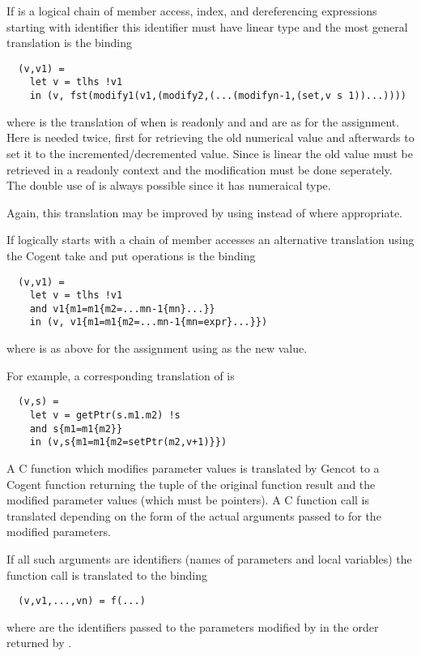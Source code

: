 If  is a logical chain of  member access, index, and dereferencing expressions starting with identifier 
this identifier must have linear type and the most general translation is the binding
\begin{verbatim}
  (v,v1) = 
    let v = tlhs !v1
    in (v, fst(modify1(v1,(modify2,(...(modifyn-1,(set,v s 1))...))))
\end{verbatim}
where  is the translation of  when  is readonly and  and  are as 
for the assignment. Here  is needed twice, first for retrieving the old
numerical value  and afterwards to set it to the incremented/decremented value. Since  is linear the old
value must be retrieved in a readonly context and the modification must be done seperately. The double use of 
is always possible since it has numeraical type.

Again, this translation may be improved by using  instead of  where appropriate.

If  logically starts with a chain of member accesses  an alternative translation using the Cogent
take and put operations is the binding
\begin{verbatim}
  (v,v1) =
    let v = tlhs !v1
    and v1{m1=m1{m2=...mn-1{mn}...}} 
    in (v, v1{m1=m1{m2=...mn-1{mn=expr}...}})
\end{verbatim}
where  is as above for the assignment using  as the new value.

For example, a corresponding translation of  is
\begin{verbatim}
  (v,s) =
    let v = getPtr(s.m1.m2) !s
    and s{m1=m1{m2}}
    in (v,s{m1=m1{m2=setPtr(m2,v+1)}})
\end{verbatim}

A C function which modifies parameter values is translated by Gencot to a Cogent function returning the tuple 
of the original function result  and the modified parameter values  (which must be pointers). 
A C function call  is
translated depending on the form of the actual arguments passed to  for the modified parameters.

If all such arguments are identifiers (names of parameters and local variables) the function call is translated to
the binding
\begin{verbatim}
  (v,v1,...,vn) = f(...)
\end{verbatim}
where  are the identifiers passed to the parameters modified by  in the order returned by .

